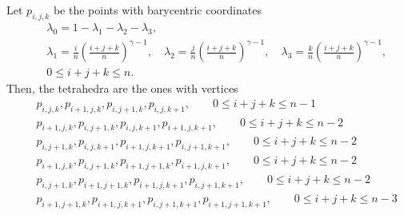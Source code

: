 Let $p_{i,j,k}$ be the points with barycentric coordinates
\begin{eqnarray*}
&&\lambda_0=1-\lambda_1-\lambda_2-\lambda_3,\\
&&\lambda_1=\frac in\left(\frac{i+j+k}n\right)^{\gamma-1},\quad \lambda_2=\frac jn\left(\frac{i+j+k}n\right)^{\gamma-1},\quad \lambda_3=\frac kn\left(\frac{i+j+k}n\right)^{\gamma-1},
\\ &&0\le i+j+k\le n.
\end{eqnarray*}
Then, the tetrahedra are the ones with vertices
\begin{eqnarray*}
&& p_{i,j,k}, p_{i+1,j,k}, p_{i,j+1,k}, p_{i,j,k+1}, \qquad 0\le i+j+k\le n-1\\
&& p_{i+1,j,k}, p_{i,j+1,k}, p_{i,j,k+1}, p_{i+1,j,k+1}, \qquad 0\le i+j+k\le n-2\\
&& p_{i,j+1,k}, p_{i,j,k+1}, p_{i+1,j,k+1}, p_{i,j+1,k+1}, \qquad 0\le i+j+k\le n-2\\
&& p_{i+1,j,k}, p_{i,j+1,k}, p_{i+1,j+1,k}, p_{i+1,j,k+1}, \qquad 0\le i+j+k\le n-2\\
&& p_{i,j+1,k}, p_{i+1,j+1,k}, p_{i+1,j,k+1}, p_{i,j+1,k+1}, \qquad 0\le i+j+k\le n-2\\
&& p_{i+1,j+1,k}, p_{i+1,j,k+1}, p_{i,j+1,k+1}, p_{i+1,j+1,k+1}, \qquad 0\le i+j+k\le n-3
\end{eqnarray*}


